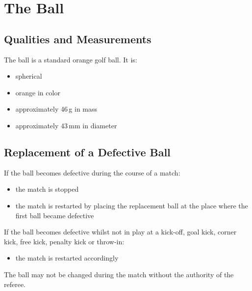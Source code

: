 \section{The Ball}\label{sec:ball}

\subsection{Qualities and Measurements}
The ball is a standard orange golf ball.
It is:
\begin{itemize}
\item spherical
\item orange in color
\item approximately 46\,g in mass
\item approximately 43\,mm in diameter
\end{itemize}

\subsection{Replacement of a Defective Ball}
If the ball becomes defective during the course of a match:
\begin{itemize}
\item the match is stopped
\item the match is restarted by placing the replacement ball at the place where the first ball became defective
\end{itemize}

If the ball becomes defective whilst not in play at a kick-off, goal kick, corner kick, free kick, penalty kick\added{,} or throw-in:
\begin{itemize}
\item the match is restarted accordingly
\end{itemize}

The ball may not be changed during the match without the authority of the referee.
